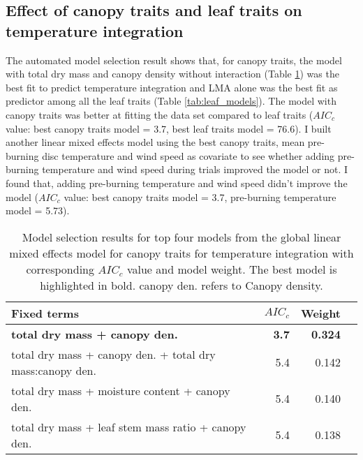 \documentclass{ttuthes2007}
\begin{document}

\subsection{Effect of canopy traits and leaf traits on temperature integration}

The automated model selection result shows that, for canopy traits, the model with total dry mass and canopy density without interaction (Table \ref{tab:canopy_models}) was the best fit to predict temperature integration and \MakeUppercase{lma} alone was the best fit as predictor among all the leaf traits (Table \ref{tab:leaf_models}). The model with canopy traits was better at fitting the data set compared to leaf traits ($AIC_{c}$ value: best canopy traits model = 3.7, best leaf traits model = 76.6). I built another linear mixed effects model using the best canopy traits, mean pre-burning disc temperature and wind speed as  covariate to see whether adding pre-burning temperature and wind speed during trials improved the model or not. I found that, adding pre-burning temperature and wind speed didn't improve the model ($AIC_{c}$ value: best canopy traits model = 3.7, pre-burning temperature model = 5.73).

\begin{table}
  \centering
  \caption{Model selection results for top four models from the global linear
    mixed effects model for canopy traits for temperature integration with
    corresponding $AIC_{c}$ value and model weight. The best model is highlighted in bold. canopy den. refers to Canopy density.}
  \begin{tabular}{lrrr}
    \toprule
    \textbf{Fixed terms} & \textbf{$AIC_{c}$} & \textbf{Weight}\\
    \midrule
    \textbf{total dry mass + canopy den.}    & \textbf{3.7} &  \textbf{0.324}\\
    total dry mass + canopy den. + total dry mass:canopy den. & 5.4  & 0.142 \\
    total dry mass + moisture content + canopy den.   & 5.4   & 0.140 \\ 
    total dry mass + leaf stem mass ratio + canopy den.  & 5.4 & 0.138  \\
    \bottomrule
  \end{tabular}
  \label{tab:canopy_models}
\end{table}
\end{document}
